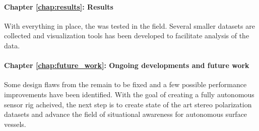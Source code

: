 \paragraph{Chapter \ref{chap:results}: Results}
With everything in place, the \sr was tested in the field.
Several smaller datasets are collected and visualization tools has been developed to facilitate analysis of the data.

\paragraph{Chapter \ref{chap:future_work}: Ongoing developments and future work}
Some design flaws from the \preproject remain to be fixed and a few possible performance improvements have been identified.
With the goal of creating a fully autonomous sensor rig acheived, the next step is to create state of the art stereo polarization datasets and advance the field of situational awareness for autonomous surface vessels.